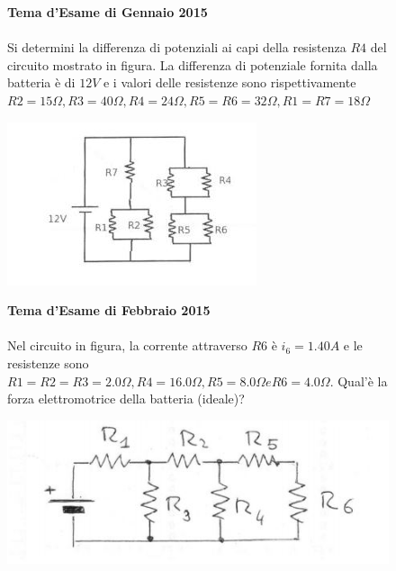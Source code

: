 \begin{figure}[h!]
\textbf{Tema d'Esame di Gennaio 2015}\\ \\
Si determini la differenza di potenziali ai capi della resistenza $R4$ del circuito mostrato in figura. La differenza di potenziale fornita dalla batteria è di $12V$ e i valori delle resistenze sono rispettivamente $R2=15\Omega, R3=40\Omega, R4=24\Omega, R5=R6=32\Omega, R1=R7=18\Omega$
\begin{center}
		\includegraphics[scale=1.2]{ES5/GEN052015.jpg}
	\end{center}
\end{figure}

\begin{figure}[h!]
\textbf{Tema d'Esame di Febbraio 2015}\\ \\
 Nel circuito in figura, la corrente attraverso $R6$ è $i_6=1.40A$ e le resistenze sono
$R1=R2=R3=2.0\Omega, R4= 16.0\Omega, R5= 8.0 \Omega e R6= 4.0 \Omega$. Qual'è la forza elettromotrice della batteria (ideale)?
\begin{center}
		\includegraphics[scale=0.8]{ES5/FEB052015.jpg}
	\end{center}
\end{figure}

